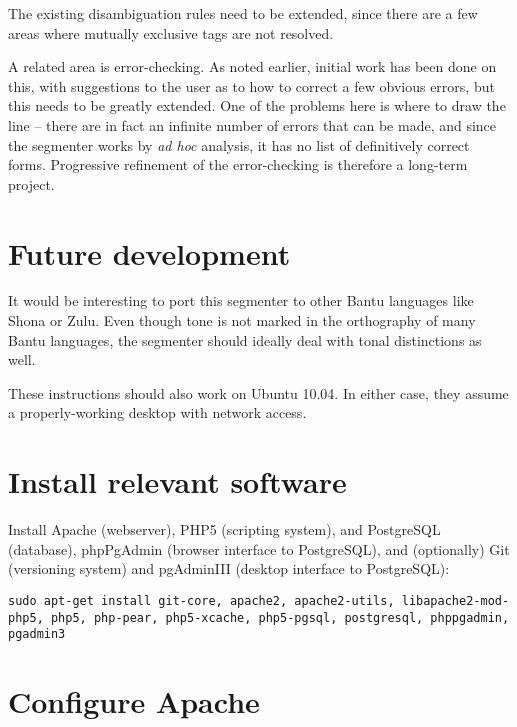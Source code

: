 \documentclass[a4paper,10pt]{article}
\begin{document}
The existing disambiguation rules need to be extended, since there are a few areas where mutually exclusive tags are not resolved.

A related area is error-checking. As noted earlier, initial work has been done on this, with suggestions to the user as to how to correct a few obvious errors, but this needs to be greatly extended.  One of the problems here is where to draw the line -- there are in fact an infinite number of errors that can be made, and since the segmenter works by \textit{ad hoc} analysis, it has no list of definitively correct forms.  Progressive refinement of the error-checking is therefore a long-term project.

\section{Future development}

It would be interesting to port this segmenter to other Bantu languages like Shona or Zulu.  Even though tone is not marked in the orthography of many Bantu languages, the segmenter should ideally deal with tonal distinctions as well.















\newpage
\appendix
\renewcommand{\appendixpagename}{Appendix:\\
Configuring Ubuntu 9.10}
\appendixpage

These instructions should also work on Ubuntu 10.04. In either case, they assume a properly-working desktop with network access.

\section{Install relevant software}

Install Apache (webserver), PHP5 (scripting system), and PostgreSQL (database), phpPgAdmin (browser interface to PostgreSQL), and (optionally) Git (versioning system) and pgAdminIII (desktop interface to PostgreSQL):

\texttt{sudo apt-get install git-core, apache2, apache2-utils, libapache2-mod-php5, php5, php-pear, php5-xcache, php5-pgsql, postgresql, phppgadmin, pgadmin3}

\section{Configure Apache}
\end{document}
